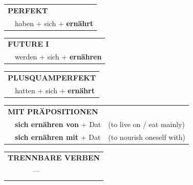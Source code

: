 \documentclass[10pt,a4paper]{revtex4-2}
\begin{document}
\begin{verbbox}
 \begin{tabular}{rl}
     \multicolumn{2}{l}{\textbf{PERFEKT}}\\
   & haben + sich + \textbf{ernährt}\\
  \end{tabular}
\hfill
   \begin{tabular}{rl}
    \multicolumn{2}{l}{\textbf{FUTURE I}}\\
   & werden + sich + \textbf{ernähren}\\
  \end{tabular}
\hfill
   \begin{tabular}{rl}
      \multicolumn{2}{l}{\textbf{PLUSQUAMPERFEKT}}\\
   & hatten + sich + \textbf{ernährt}\\
  \end{tabular}

   \vspace{10pt}

   \begin{tabular}{lll}
      \multicolumn{3}{l}{\textbf{MIT PRÄPOSITIONEN}}\\
& \textbf{sich ernähren von} + Dat & (to live on / eat mainly)\\
& \textbf{sich ernähren mit} + Dat & (to nourish oneself with)\\
\end{tabular}
  \hfill
\begin{tabular}{lll}
\multicolumn{3}{l}{\textbf{TRENNBARE VERBEN}}\\
& ---\\
\vspace{10pt}
\end{tabular}

\end{verbbox}
\end{document}
